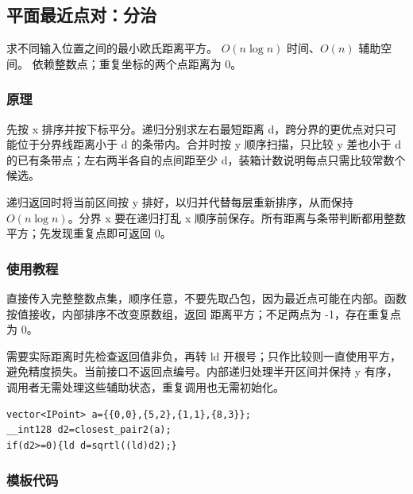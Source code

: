 \subsection{平面最近点对：分治}
\label{geo:closest-pair}
\AlgorithmInfo
    {求不同输入位置之间的最小欧氏距离平方。}
    {$O(n\log n)$ 时间、$O(n)$ 辅助空间。}
    {依赖整数点；重复坐标的两个点距离为 0。}
\subsubsection*{原理}

先按 x 排序并按下标平分。递归分别求左右最短距离 d，跨分界的更优点对只可能位于分界线距离小于 d 的条带内。合并时按 y 顺序扫描，只比较 y 差也小于 d 的已有条带点；左右两半各自的点间距至少 d，装箱计数说明每点只需比较常数个候选。

递归返回时将当前区间按 y 排好，以归并代替每层重新排序，从而保持 $O(n\log n)$。分界 x 要在递归打乱 x 顺序前保存。所有距离与条带判断都用整数平方；先发现重复点即可返回 0。

\subsubsection*{使用教程}
 直接传入完整整数点集，顺序任意，不要先取凸包，因为最近点可能在内部。函数按值接收，内部排序不改变原数组，返回  距离平方；不足两点为 -1，存在重复点为 0。

需要实际距离时先检查返回值非负，再转 ld 开根号；只作比较则一直使用平方，避免精度损失。当前接口不返回点编号。内部递归处理半开区间并保持 y 有序，调用者无需处理这些辅助状态，重复调用也无需初始化。
\begin{lstlisting}[style=mtycpp,numbers=none]
vector<IPoint> a={{0,0},{5,2},{1,1},{8,3}};
__int128 d2=closest_pair2(a);
if(d2>=0){ld d=sqrtl((ld)d2);}
\end{lstlisting}
\subsubsection*{模板代码}
